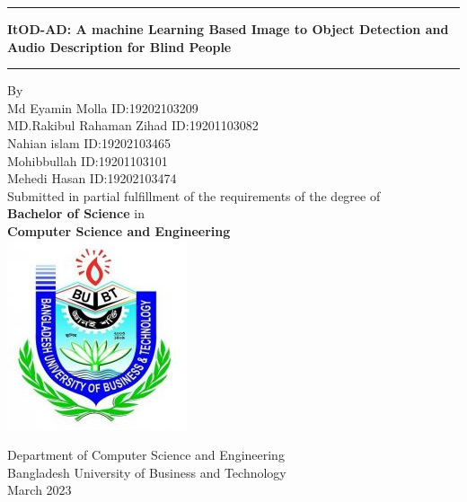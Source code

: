 
\begin{titlepage}
    \begin{center}
    \hrule
    \vspace{2mm}
     \large \textbf{ ItOD-AD: A machine Learning Based Image to Object Detection and Audio Description for Blind People}
    \vspace{2mm}
    \hrule 
    \vspace{20mm}
    By\\
    Md Eyamin Molla   \hspace{12mm} ID:19202103209 \\
    MD.Rakibul Rahaman Zihad \hspace{5.5mm} ID:19201103082 \\
    Nahian islam      \hspace{11mm} ID:19202103465 \\
    Mohibbullah          \hspace{16mm} ID:19201103101 \\
     Mehedi Hasan          \hspace{16mm} ID:19202103474 \\
    \vspace{15mm}
    \large Submitted in partial fulfillment of the requirements of the degree of\\
\large  \textbf{Bachelor of Science} in\\
\large \textbf{Computer Science and Engineering}\\
\vspace{15mm}
\includegraphics[scale=0.5]{BUBT_logo.jpg}

\large Department of Computer Science and Engineering\\
\large Bangladesh University of Business and Technology\\
\vspace{10mm}
\large March 2023
    
    \end{center}
\end{titlepage}
